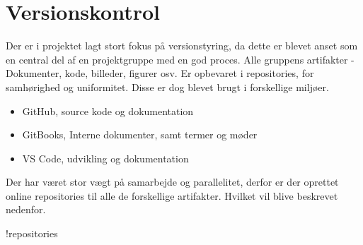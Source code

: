 \section{Versionskontrol}

Der er i projektet lagt stort fokus på versionstyring, da dette er blevet anset som en central del af en projektgruppe med en god proces. Alle gruppens artifakter - Dokumenter, kode, billeder, figurer osv. Er opbevaret i repositories, for samhørighed og uniformitet. Disse er dog blevet brugt i forskellige miljøer.

\begin{itemize}
    \item GitHub, source kode og dokumentation
    \item GitBooks, Interne dokumenter, samt termer og møder
    \item VS Code, udvikling og dokumentation
\end{itemize}

Der har været stor vægt på samarbejde og parallelitet, derfor er der oprettet online repositories til alle de forskellige artifakter. Hvilket vil blive beskrevet nedenfor.

{!repositories}